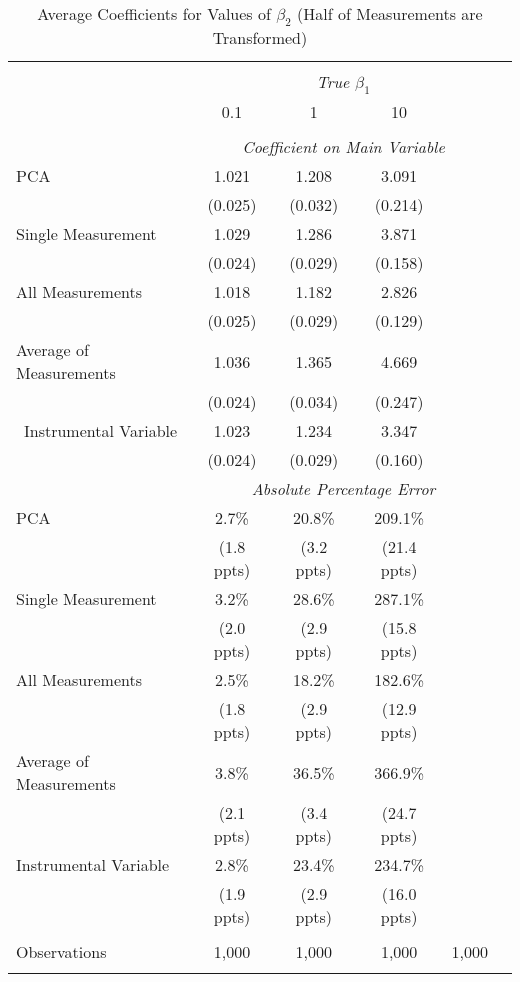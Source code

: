 \begin{table}[!htbp] \centering
  \caption{Average Coefficients for Values of $\beta_2$ (Half of Measurements are Transformed) \label{sim_beta2_5_exp}}
\begin{tabular}{@{\extracolsep{5pt}}lccccc}
\\[-1.8ex]\hline
\hline \\[-1.8ex]
& \multicolumn{4}{c}{\textit{True $\beta_1$}} \
\cr \
\\[-1.8ex] & 0.1 & 1 & 10\\
\hline \\[-1.8ex]
& \multicolumn{4}{c}{\textit{Coefficient on Main Variable}} \\
 PCA & 1.021 & 1.208 & 3.091  \\
  & (0.025) & (0.032) & (0.214)\\
  Single Measurement & 1.029 & 1.286 & 3.871  \\
& (0.024) & (0.029) & (0.158)\\
 All Measurements & 1.018 & 1.182 & 2.826  \\
  & (0.025) & (0.029) & (0.129)\\
 Average of Measurements & 1.036 & 1.365 & 4.669  \\
  & (0.024) & (0.034) & (0.247)\\\
  Instrumental Variable & 1.023 & 1.234 & 3.347 \\
& (0.024) & (0.029) & (0.160) \\
& \multicolumn{4}{c}{\textit{Absolute Percentage Error}} \\
  PCA & 2.7\% & 20.8\% & 209.1\%  \\
   & (1.8 ppts) & (3.2 ppts) & (21.4 ppts)\\
   Single Measurement & 3.2\% & 28.6\% & 287.1\%  \\
& (2.0 ppts) & (2.9 ppts) & (15.8 ppts) \\
All Measurements & 2.5\% & 18.2\% & 182.6\%  \\
  & (1.8 ppts) & (2.9 ppts) & (12.9 ppts)\\
  Average of Measurements & 3.8\% & 36.5\% & 366.9\%  \\
  & (2.1 ppts) & (3.4 ppts) & (24.7 ppts)\\
  Instrumental Variable & 2.8\% & 23.4\% & 234.7\%  \\
& (1.9 ppts) & (2.9 ppts) & (16.0 ppts)\\

\hline \\[-1.8ex]
 Observations & 1,000 & 1,000 & 1,000 & 1,000 &\\
\hline
\hline \\[-1.8ex]
\end{tabular}
\end{table}